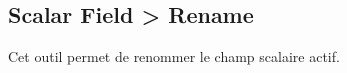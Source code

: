 \subsection{Scalar Field > Rename}
\label{subsection:sfRename}

Cet outil permet de renommer le champ scalaire actif.
